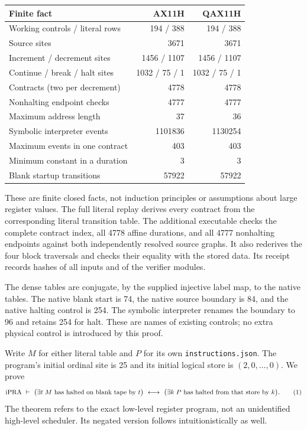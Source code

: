 \begin{center}
\begin{tabular}{lrr}
\toprule
Finite fact & AX11H & QAX11H\\
\midrule
Working controls / literal rows & 194 / 388 & 194 / 388\\
Source sites & 3671 & 3671\\
Increment / decrement sites & 1456 / 1107 & 1456 / 1107\\
Continue / break / halt sites & 1032 / 75 / 1 & 1032 / 75 / 1\\
Contracts (two per decrement) & 4778 & 4778\\
Nonhalting endpoint checks & 4777 & 4777\\
Maximum address length & 37 & 36\\
Symbolic interpreter events & 1101836 & 1130254\\
Maximum events in one contract & 403 & 403\\
Minimum constant in a duration & 3 & 3\\
Blank startup transitions & 57922 & 57922\\
\bottomrule
\end{tabular}
\end{center}

These are finite closed facts, not induction principles or assumptions about
large register values.  The full literal replay derives every contract from
the corresponding literal transition table.  The additional executable
 checks the complete contract index, all
4778 affine durations, and all 4777 nonhalting endpoints against both
independently resolved source graphs.  It also rederives the four block
traversals and checks their equality with the stored data.  Its receipt
records hashes of all inputs and of the verifier modules.

The dense tables are conjugate, by the supplied injective label map, to
the native tables.  The native blank start is 74, the native source boundary
is 84, and the native halting control is 254.  The symbolic interpreter
renames the boundary to 96 and retains 254 for halt.  These are names of
existing controls; no extra physical control is introduced by this proof.

Write $M$ for either literal table and $P$ for its own
\texttt{instructions.json}.  The program's initial ordinal site is 25 and
its initial logical store is $(2,0,\ldots,0)$.  We prove
\[
 \mathrm{iPRA}\ \vdash\
 \bigl(\exists t\; M\text{ has halted on blank tape by }t\bigr)
 \ \longleftrightarrow\
 \bigl(\exists k\; P\text{ has halted from that store by }k\bigr).
 \tag{1}
\]
The theorem refers to the exact low-level register program, not an
unidentified high-level scheduler.  Its negated version follows
intuitionistically as well.

